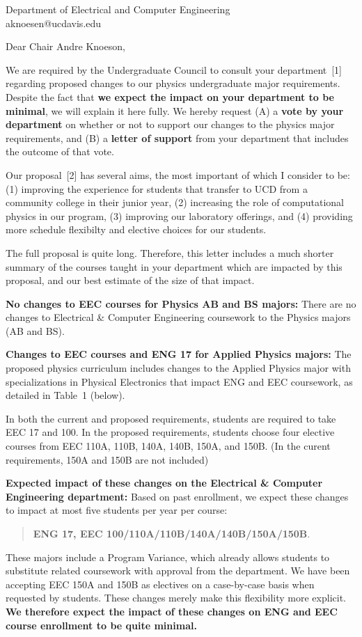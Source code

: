 \documentclass[letterpaper,12pt]{letter}
\def\letterparta{
We are required by the Undergraduate Council to consult your
department~[1] regarding proposed changes to our physics undergraduate
major requirements.  Despite the fact that {\bf we expect the
  impact on your department to be minimal}, we will explain it here
fully.  We hereby request (A) a {\bf vote by your department} on
whether or not to support our changes to the physics major
requirements, and (B) a {\bf letter of support} from your department
that includes the outcome of that vote.

Our proposal~[2] has several aims, the most important of which I
consider to be: (1) improving the experience for students that
transfer to UCD from a community college in their junior year, (2)
increasing the role of computational physics in our program, (3)
improving our laboratory offerings, and (4) providing more schedule
flexibilty and elective choices for our students.

The full proposal is quite long.  Therefore, this letter includes a
much shorter summary of the courses taught in your department which
are impacted by this proposal, and our best estimate of the size of
that impact.
}
\begin{document}
\begin{letter}{Department of Electrical and Computer Engineering \\ aknoesen@ucdavis.edu}
  
\opening{Dear Chair Andre Knoeson,}

\letterparta

{\bf No changes to EEC courses for Physics AB and BS majors:} There
are no changes to Electrical \& Computer Engineering coursework to the
Physics majors (AB and BS).

{\bf Changes to EEC courses and ENG 17 for Applied Physics majors:}  
The proposed physics curriculum includes changes to the Applied
Physics major with specializations in Physical Electronics that impact
ENG and EEC coursework, as detailed in Table~1 (below).

In both the current and proposed requirements, students are required
to take EEC 17 and 100.  In the proposed requirements, students choose
four elective courses from EEC 110A, 110B, 140A, 140B, 150A, and 150B.
(In the curent requirements, 150A and 150B are not included)

{\bf Expected impact of these changes on the Electrical \& Computer
  Engineering department:} Based on past enrollment, we expect these
changes to impact at most five students per year per course:
\begin{quote}
{\bf ENG
  17, EEC 100/110A/110B/140A/140B/150A/150B}.
\end{quote}

These majors include a Program Variance, which already allows students
to substitute related coursework with approval from the department.
We have been accepting EEC 150A and 150B as electives on a
case-by-case basis when requested by students.  These changes merely
make this flexibility more explicit.
{\bf We therefore expect the impact of these changes on ENG and EEC
  course enrollment to be quite minimal.}


\end{letter}
\end{document}
